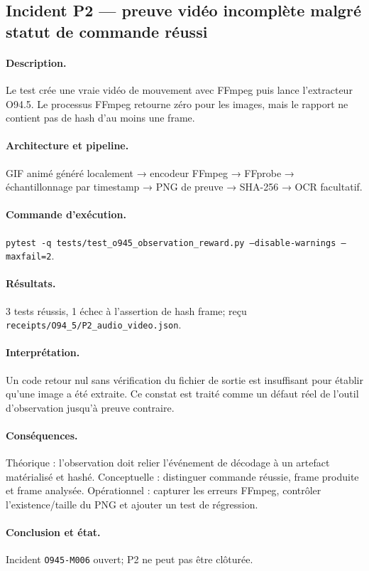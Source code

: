 \documentclass[11pt,a4paper]{article}
\begin{document}
\subsection{Incident P2 — preuve vidéo incomplète malgré statut de commande réussi}
\paragraph{Description.} Le test crée une vraie vidéo de mouvement avec FFmpeg puis lance l'extracteur O94.5. Le processus FFmpeg retourne zéro pour les images, mais le rapport ne contient pas de hash d'au moins une frame.
\paragraph{Architecture et pipeline.} GIF animé généré localement → encodeur FFmpeg → FFprobe → échantillonnage par timestamp → PNG de preuve → SHA-256 → OCR facultatif.
\paragraph{Commande d'exécution.} \texttt{pytest -q tests/test\_o945\_observation\_reward.py --disable-warnings --maxfail=2}.
\paragraph{Résultats.} 3 tests réussis, 1 échec à l'assertion de hash frame; reçu \texttt{receipts/O94\_5/P2\_audio\_video.json}.
\paragraph{Interprétation.} Un code retour nul sans vérification du fichier de sortie est insuffisant pour établir qu'une image a été extraite. Ce constat est traité comme un défaut réel de l'outil d'observation jusqu'à preuve contraire.
\paragraph{Conséquences.} Théorique : l'observation doit relier l'événement de décodage à un artefact matérialisé et hashé. Conceptuelle : distinguer commande réussie, frame produite et frame analysée. Opérationnel : capturer les erreurs FFmpeg, contrôler l'existence/taille du PNG et ajouter un test de régression.
\paragraph{Conclusion et état.} Incident \texttt{O945-M006} ouvert; P2 ne peut pas être clôturée.
\end{document}
